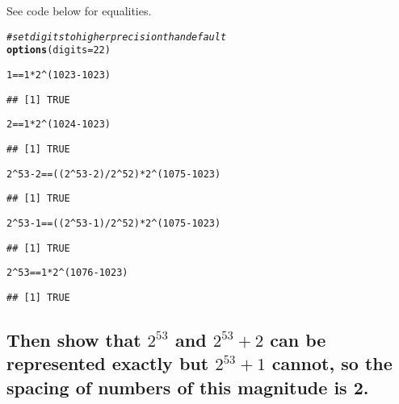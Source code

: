 \documentclass{article}\usepackage[]{graphicx}\usepackage[]{color}
\makeatletter
\newcommand{\hlnum}[1]{\textcolor[rgb]{0.686,0.059,0.569}{#1}}%
\newcommand{\hlcom}[1]{\textcolor[rgb]{0.678,0.584,0.686}{\textit{#1}}}%
\newcommand{\hlopt}[1]{\textcolor[rgb]{0,0,0}{#1}}%
\newcommand{\hlstd}[1]{\textcolor[rgb]{0.345,0.345,0.345}{#1}}%
\newcommand{\hlkwc}[1]{\textcolor[rgb]{0.333,0.667,0.333}{#1}}%
\newcommand{\hlkwd}[1]{\textcolor[rgb]{0.737,0.353,0.396}{\textbf{#1}}}%
\newenvironment{kframe}{%
 \def\at@end@of@kframe{}%
 \ifinner\ifhmode%
  \def\at@end@of@kframe{\end{minipage}}%
  \begin{minipage}{\columnwidth}%
 \fi\fi%
 \def\FrameCommand##1{\hskip\@totalleftmargin \hskip-\fboxsep
 \colorbox{shadecolor}{##1}\hskip-\fboxsep
     \hskip-\linewidth \hskip-\@totalleftmargin \hskip\columnwidth}%
 \MakeFramed {\advance\hsize-\width
   \@totalleftmargin\z@ \linewidth\hsize
   \@setminipage}}%
 {\par\unskip\endMakeFramed%
 \at@end@of@kframe}
\newenvironment{knitrout}{}{} %
\makeatother
\begin{document}
See code below for equalities.
\begin{knitrout}
\color{fgcolor}\begin{kframe}
\begin{alltt}
\hlcom{#set digits to higher precision than default}
\hlkwd{options}\hlstd{(}\hlkwc{digits} \hlstd{=} \hlnum{22}\hlstd{)}

\hlnum{1} \hlopt{==} \hlnum{1}\hlopt{*}\hlnum{2}\hlopt{^}\hlstd{(}\hlnum{1023}\hlopt{-}\hlnum{1023}\hlstd{)}
\end{alltt}
\begin{verbatim}
## [1] TRUE
\end{verbatim}
\begin{alltt}
\hlnum{2} \hlopt{==} \hlnum{1}\hlopt{*}\hlnum{2}\hlopt{^}\hlstd{(}\hlnum{1024}\hlopt{-}\hlnum{1023}\hlstd{)}
\end{alltt}
\begin{verbatim}
## [1] TRUE
\end{verbatim}
\begin{alltt}
\hlnum{2}\hlopt{^}\hlnum{53} \hlopt{-} \hlnum{2} \hlopt{==} \hlstd{((}\hlnum{2}\hlopt{^}\hlnum{53} \hlopt{-} \hlnum{2}\hlstd{)} \hlopt{/} \hlnum{2}\hlopt{^}\hlnum{52}\hlstd{)} \hlopt{*} \hlnum{2}\hlopt{^}\hlstd{(}\hlnum{1075} \hlopt{-} \hlnum{1023}\hlstd{)}
\end{alltt}
\begin{verbatim}
## [1] TRUE
\end{verbatim}
\begin{alltt}
\hlnum{2}\hlopt{^}\hlnum{53} \hlopt{-} \hlnum{1} \hlopt{==} \hlstd{((}\hlnum{2}\hlopt{^}\hlnum{53} \hlopt{-} \hlnum{1}\hlstd{)} \hlopt{/} \hlnum{2}\hlopt{^}\hlnum{52}\hlstd{)} \hlopt{*} \hlnum{2}\hlopt{^}\hlstd{(}\hlnum{1075} \hlopt{-} \hlnum{1023}\hlstd{)}
\end{alltt}
\begin{verbatim}
## [1] TRUE
\end{verbatim}
\begin{alltt}
\hlnum{2}\hlopt{^}\hlnum{53} \hlopt{==} \hlnum{1}\hlopt{*}\hlnum{2}\hlopt{^}\hlstd{(}\hlnum{1076}\hlopt{-}\hlnum{1023}\hlstd{)}
\end{alltt}
\begin{verbatim}
## [1] TRUE
\end{verbatim}
\end{kframe}
\end{knitrout}


\subsection{Then show that $2^{53}$ and $2^{53} + 2$ can be represented exactly but $2^{53} + 1$ cannot, so the spacing of numbers of this magnitude is 2.}
\end{document}
